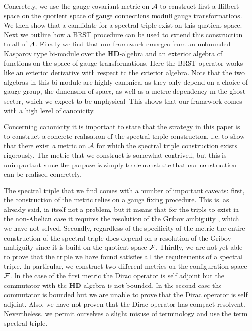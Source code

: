 \documentclass[letterpaper,11pt]{article}
\def\ca{{\cal A}}
\def\cf{{\cal F}}
\begin{document}
Concretely, we use the gauge covariant metric on $\ca$ to construct first a Hilbert space on the quotient space of gauge connections moduli gauge transformations. We then show that a candidate for a spectral triple exist on this quotient space. Next we outline how a BRST procedure \cite{Becchi:1975nq,Tyutin:1975qk,Barnich:2000zw,Henneaux:1992ig} can be used to extend this construction to all of $\ca$. Finally we find that our framework emerges from an unbounded Kasparov type bi-module over the $\mathbf{HD}$-algebra and an exterior algebra of functions on the space of gauge transformations. Here the BRST operator works like an exterior derivative with respect to the exterior algebra. Note that the two algebras in this bi-module are highly canonical as they only depend on a choice of gauge group, the dimension of space, as well as a metric dependency in the ghost sector, which we expect to be unphysical. This shows that our framework comes with a high level of canonicity. 

 
 
Concerning canonicity it is important to state that the strategy in this paper is to construct a concrete realisation of the spectral triple construction, i.e. to show that there exist {\it a} metric on $\ca$ for which the spectral triple construction exists rigorously. The metric that we construct is somewhat contrived, but this is unimportant since the purpose is simply to demonstrate that our construction can be realised concretely. 



The spectral triple that we find comes with a number of important caveats: 
first, the construction of the metric relies on a gauge fixing procedure. This is, as already said, in itself not a problem, but it means that for the triple to exist in the non-Abelian case it requires the resolution of the Gribov ambiguity \cite{Gribov:1977wm,Singer:1978dk}, which we have not solved. Secondly, regardless of the specificity of the metric the entire construction of the spectral triple does depend on a resolution of the Gribov ambiguity since it is build on the quotient space $\cf$.  Thirdly, we are not yet able to prove that the triple we have found satisfies all the requirements of a spectral triple. In particular, we construct two different metrics on the configuration space $\cf$. In the case of the first metric the Dirac operator is self adjoint but the commutator with the $\mathbf{HD}$-algebra is not bounded. In the second case the commutator is bounded but we are unable to prove that the Dirac operator is self adjoint. Also, we have not proven that the Dirac operator has compact resolvent. Nevertheless, we permit ourselves a slight misuse of terminology and use the term spectral triple.
\end{document}
